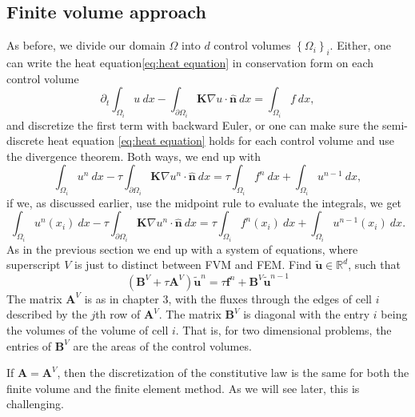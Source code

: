 \documentclass[../Main/main.tex]{subfiles}
\begin{document}
	\subsection*{Finite volume approach}
	As before, we divide our domain $\Omega$ into $d$ control volumes $\left \{ \Omega_i \right \}_i$. Either, one can write the heat equation\eqref{eq:heat equation} in conservation form on each control volume
	\begin{equation}\label{eq:semidiscrete FVM}
		\partial_t\int_{\Omega_i}u \ dx -\int_{\partial \Omega_i} \pmb{K}\nabla u \cdot \hat{\pmb{n}}\ dx = \int_{\Omega_i} f \ dx,
	\end{equation}
	and discretize the first term with backward Euler, or one can make sure the semi-discrete heat equation \eqref{eq:heat equation} holds for each control volume and use the divergence theorem. Both ways, we end up with
	\begin{equation}
		\int_{\Omega_i} u^n \ dx - \tau\int_{\partial \Omega_i} \pmb{K}\nabla u^n \cdot \hat{\pmb{n}}\ dx = \tau \int_{\Omega_i} f^n \ dx + \int_{\Omega_i} u^{n-1} \ dx,
	\end{equation}
	if we, as discussed earlier, use the midpoint rule to evaluate the integrals, we get
	\begin{equation}
		\int_{\Omega_i} u^n(x_i) \ dx - \tau\int_{\partial \Omega_i} \pmb{K}\nabla u^n \cdot \hat{\pmb{n}}\ dx = \tau \int_{\Omega_i} f^n(x_i) \ dx + \int_{\Omega_i} u^{n-1}(x_i) \ dx.
	\end{equation}
	As in the previous section we end up with a system of equations, where superscript $V$ is just to distinct between FVM and FEM. Find $\tilde{\bm{u}} \in \mathbb{R}^d$, such that
	\begin{equation}\label{eq:heat fvm disc}
		(\pmb{B}^V + \tau \pmb{A}^V)\tilde{\bm{u}}^n = \tau \pmb{f}^n + \pmb{B}^V\tilde{\bm{u}}^{n-1}
	\end{equation}
	The matrix $\pmb{A}^V$ is as in chapter 3, with the fluxes through the edges of cell $i$ described by the $j$th row of $\pmb{A}^V$. The matrix $\pmb{B}^V$ is diagonal with the entry $i$ being the volumes of the volume of cell $i$. That is, for two dimensional problems, the entries of $\bm{B}^V$ are the areas of the control volumes.
	
	If $\pmb{A}= \pmb{A}^V$, then the discretization of the constitutive law is the same for both the finite volume and the finite element method. As we will see later, this is challenging.	
\end{document}
